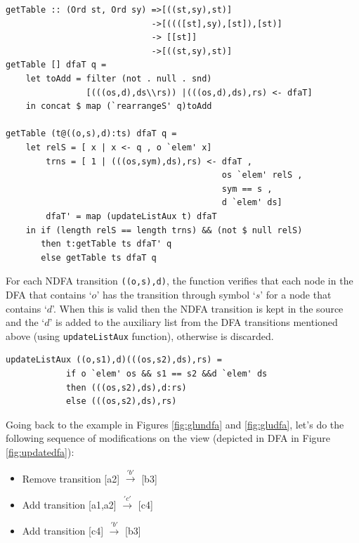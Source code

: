 \begin{verbatim}
getTable :: (Ord st, Ord sy) =>[((st,sy),st)] 
                             ->[((([st],sy),[st]),[st)]
                             -> [[st]] 
                             ->[((st,sy),st)]
getTable [] dfaT q = 
    let toAdd = filter (not . null . snd)
                [(((os,d),ds\\rs)) |(((os,d),ds),rs) <- dfaT]
    in concat $ map (`rearrangeS' q)toAdd
    
getTable (t@((o,s),d):ts) dfaT q = 
    let relS = [ x | x <- q , o `elem' x]
        trns = [ 1 | (((os,sym),ds),rs) <- dfaT , 
                                           os `elem' relS ,
                                           sym == s , 
                                           d `elem' ds]
        dfaT' = map (updateListAux t) dfaT
    in if (length relS == length trns) && (not $ null relS) 
       then t:getTable ts dfaT' q
       else getTable ts dfaT q
\end{verbatim}

\vspace{5mm}
For each NDFA transition \texttt{((o,s),d)}, the function verifies that each node in the DFA that contains `$o$' has the transition through symbol `$s$' for a node that contains `$d$'. When this is valid then the NDFA transition is kept in the source and the `$d$' is added to the auxiliary list from the DFA transitions mentioned above (using \texttt{updateListAux} function), otherwise is discarded. 



\begin{verbatim}
updateListAux ((o,s1),d)(((os,s2),ds),rs) = 
            if o `elem' os && s1 == s2 &&d `elem' ds
            then (((os,s2),ds),d:rs)
            else (((os,s2),ds),rs)
\end{verbatim}

Going back to the example in Figures \ref{fig:glundfa} and \ref{fig:gludfa}, let's do the following sequence of modifications on the view (depicted in DFA in Figure \ref{fig:updatedfa}):

\begin{itemize}
    \item Remove transition [a2] $\xrightarrow{'b'}$ [b3]
    \item Add transition [a1,a2] $\xrightarrow{'c'}$ [c4]
    \item Add transition [c4] $\xrightarrow{'b'}$ [b3]
\end{itemize}


